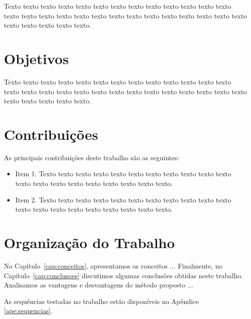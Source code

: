  Texto texto texto texto texto texto texto texto texto texto texto texto texto
texto texto texto texto texto texto texto texto texto texto texto texto texto
texto texto texto texto texto texto.

\section{Objetivos}
\label{sec:objetivo}

Texto texto texto texto texto texto texto texto texto texto texto texto texto
texto texto texto texto texto texto texto texto texto texto texto texto texto
texto texto texto texto texto texto.

\section{Contribuições}
\label{sec:contribucoes}

As principais contribuições deste trabalho são as seguintes:

\begin{itemize}
  \item Item 1. Texto texto texto texto texto texto texto texto texto texto
  texto texto texto texto texto texto texto texto texto texto.

  \item Item 2. Texto texto texto texto texto texto texto texto texto texto
  texto texto texto texto texto texto texto texto texto texto.

\end{itemize}

\section{Organização do Trabalho}
\label{sec:organizacao_trabalho}

No Capítulo~\ref{cap:conceitos}, apresentamos os conceitos ... Finalmente, no
Capítulo~\ref{cap:conclusoes} discutimos algumas conclusões obtidas neste
trabalho. Analisamos as vantagens e desvantagens do método proposto ... 

As sequências testadas no trabalho estão disponíveis no Apêndice \ref{ape:sequencias}.
